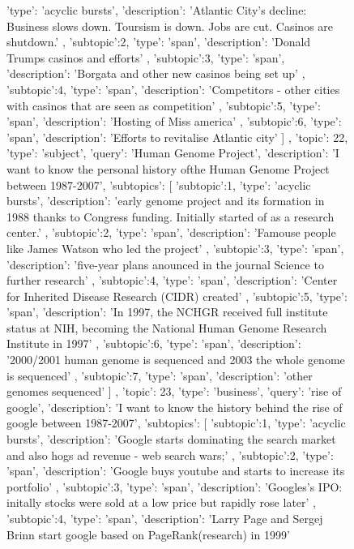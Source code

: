 \begin{figure}[ht]
{\begin{minipage}{\textwidth}
{{				'type': 'acyclic bursts',
				'description': 'Atlantic City's decline: Business slows down. Toursism is down. Jobs are cut. Casinos are shutdown.'
			},
			{
				'subtopic':2,
				'type': 'span',
				'description': 'Donald Trumps casinos and efforts'
			},
			{
				'subtopic':3,
				'type': 'span',
				'description': 'Borgata and other new casinos being set up'
			},
			{
				'subtopic':4,
				'type': 'span',
				'description': 'Competitors - other cities with casinos that are seen as competition'
			},
			{
				'subtopic':5,
				'type': 'span',
				'description': 'Hosting of Miss america'
			},
			{
				'subtopic':6,
				'type': 'span',
				'description': 'Efforts to revitalise Atlantic city'
			}	
		]
	},
	{		
		'topic': 22,
		'type': 'subject',
		'query': 'Human Genome Project',
		'description': 'I want to know the personal history ofthe Human Genome Project between 1987-2007',
		'subtopics': [
			{
				'subtopic':1,
				'type': 'acyclic bursts',
				'description': 'early genome project and its formation in 1988 thanks to Congress funding. Initially started of as a research center.'
			},
			{
				'subtopic':2,
				'type': 'span',
				'description': 'Famouse people like James Watson who led the project'
			},
			{
				'subtopic':3,
				'type': 'span',
				'description': 'five-year plans anounced in the journal Science to further research'
			},
			{
				'subtopic':4,
				'type': 'span',
				'description': 'Center for Inherited Disease Research (CIDR) created'
			},
			{
				'subtopic':5,
				'type': 'span',
				'description': 'In 1997, the NCHGR received full institute status at NIH, becoming the National Human Genome Research Institute in 1997'
			},
			{
				'subtopic':6,
				'type': 'span',
				'description': '2000/2001 human genome is sequenced and 2003 the whole genome is sequenced'
			},
			{
				'subtopic':7,
				'type': 'span',
				'description': 'other genomes sequenced'
			}
		]
	},
	{		
		'topic': 23,
		'type': 'business',
		'query': 'rise of google',
		'description': 'I want to know the history behind the rise of google between 1987-2007',
		'subtopics': [
			{
				'subtopic':1,
				'type': 'acyclic bursts',
				'description': 'Google starts dominating the search market and also hogs ad revenue - web search wars;'
			},
			{
				'subtopic':2,
				'type': 'span',
				'description': 'Google buys youtube and starts to increase its portfolio'
			},
			{
				'subtopic':3,
				'type': 'span',
				'description': 'Googles's IPO: initally stocks were sold at a low price but rapidly rose later'
			},
			{
				'subtopic':4,
				'type': 'span',
				'description': 'Larry Page and Sergej Brinn start google based on PageRank(research) in 1999'
}}
\end{minipage}}
\end{figure}
